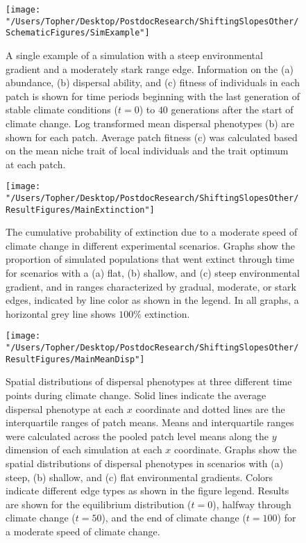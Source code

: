 \documentclass[11pt]{article}
\begin{document}
\begin{figure}[h!]
\texttt{[image: "/Users/Topher/Desktop/PostdocResearch/ShiftingSlopesOther/SchematicFigures/SimExample"]}
\caption{A single example of a simulation with a steep environmental gradient and a moderately stark range edge. Information on the (a) abundance, (b) dispersal ability, and (c) fitness of individuals in each patch is shown for time periods beginning with the last generation of stable climate conditions ($t = 0$) to $40$ generations after the start of climate change. Log transformed mean dispersal phenotypes (b) are shown for each patch. Average patch fitness (c) was calculated based on the mean niche trait of local individuals and the trait optimum at each patch.}
\label{fig:SimExample}
\end{figure}

\clearpage

\begin{figure}[h!]
\texttt{[image: "/Users/Topher/Desktop/PostdocResearch/ShiftingSlopesOther/ResultFigures/MainExtinction"]}
\caption{The cumulative probability of extinction due to a moderate speed of climate change in different experimental scenarios. Graphs show the proportion of simulated populations that went extinct through time for scenarios with a (a) flat, (b) shallow, and (c) steep environmental gradient, and in ranges characterized by gradual, moderate, or stark edges, indicated by line color as shown in the legend. In all graphs, a horizontal grey line shows $100\%$ extinction.}
\label{fig:ExtProb}
\end{figure}

\clearpage

\begin{figure}[h!]
\texttt{[image: "/Users/Topher/Desktop/PostdocResearch/ShiftingSlopesOther/ResultFigures/MainMeanDisp"]}
\caption{Spatial distributions of dispersal phenotypes at three different time points during climate change. Solid lines indicate the average dispersal phenotype at each $x$ coordinate and dotted lines are the interquartile ranges of patch means. Means and interquartile ranges were calculated across the pooled patch level means along the $y$ dimension of each simulation at each $x$ coordinate. Graphs show the spatial distributions of dispersal phenotypes in scenarios with (a) steep, (b) shallow, and (c) flat environmental gradients. Colors indicate different edge types as shown in the figure legend. Results are shown for the equilibrium distribution ($t = 0$), halfway through climate change ($t = 50$), and the end of climate change ($t = 100$) for a moderate speed of climate change.}
\label{fig:MeanDisp}
\end{figure}
\end{document}
